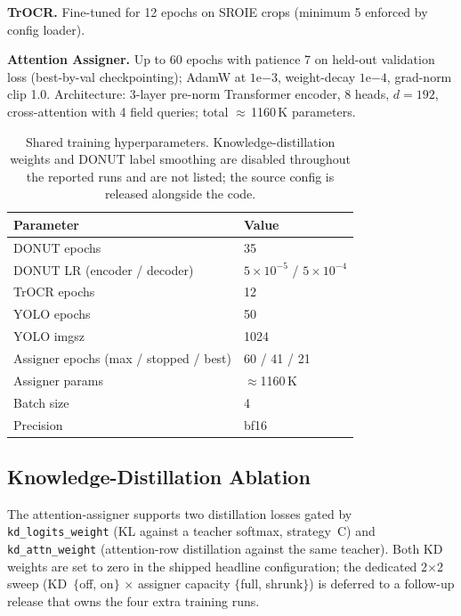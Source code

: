 \documentclass[conference]{IEEEtran}
\begin{document}
\textbf{TrOCR.}
Fine-tuned for 12 epochs on SROIE crops
(minimum 5 enforced by config loader).

\textbf{Attention Assigner.}
Up to 60 epochs with patience 7 on held-out
validation loss (best-by-val checkpointing); AdamW at
$1\mathrm{e}{-3}$, weight-decay $1\mathrm{e}{-4}$, grad-norm clip 1.0.
Architecture: $3$-layer pre-norm Transformer encoder, 8 heads,
$d{=}192$, cross-attention with 4 field queries; total
$\approx$\,1160\,K parameters.

\begin{table}[!t]
\centering
\caption{Shared training hyperparameters.  Knowledge-distillation
         weights and DONUT label smoothing are disabled throughout
         the reported runs and are not listed; the source config is
         released alongside the code.}
\label{tab:hparams}
\begin{tabular}{ll}
\toprule
Parameter & Value \\ \midrule
DONUT epochs                           & 35 \\
DONUT LR (encoder / decoder)           & $\ensuremath{5\times 10^{-5}}$ / $\ensuremath{5\times 10^{-4}}$ \\
TrOCR epochs                           & 12 \\
YOLO epochs                            & 50 \\
YOLO imgsz                             & 1024 \\
Assigner epochs (max / stopped / best) &
  60 / 41 / 21 \\
Assigner params                        & $\approx$1160\,K \\
Batch size                             & 4 \\
Precision                              & bf16 \\
\bottomrule
\end{tabular}
\end{table}

\subsection{Knowledge-Distillation Ablation}
\label{sec:kd-ablation}

The attention-assigner supports two distillation losses gated by
\texttt{kd\_logits\_weight} (KL against a teacher softmax,
strategy~C) and \texttt{kd\_attn\_weight} (attention-row
distillation against the same teacher).  Both KD weights are set to
zero in the shipped headline configuration; the dedicated 2$\times$2
sweep (KD~$\{$off, on$\}$ $\times$ assigner capacity $\{$full,
shrunk$\}$) is deferred to a follow-up release that owns the four
extra training runs.
\end{document}
